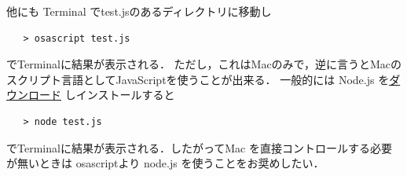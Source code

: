 他にも Terminal でtest.jsのあるディレクトリに移動し
\begin{verbatim}
   > osascript test.js
\end{verbatim}
でTerminalに結果が表示される．
ただし，これはMacのみで，逆に言うとMacのスクリプト言語としてJavaScriptを使うことが出来る．
一般的には Node.js を\href{https://nodejs.org/en}{ダウンロード}
しインストールすると
\begin{verbatim}
   > node test.js
\end{verbatim}
でTerminalに結果が表示される．したがってMac を直接コントロールする必要が無いときは osascriptより node.js を使うことをお奨めしたい．
%
%
%   
%
%
%
%
%
%



